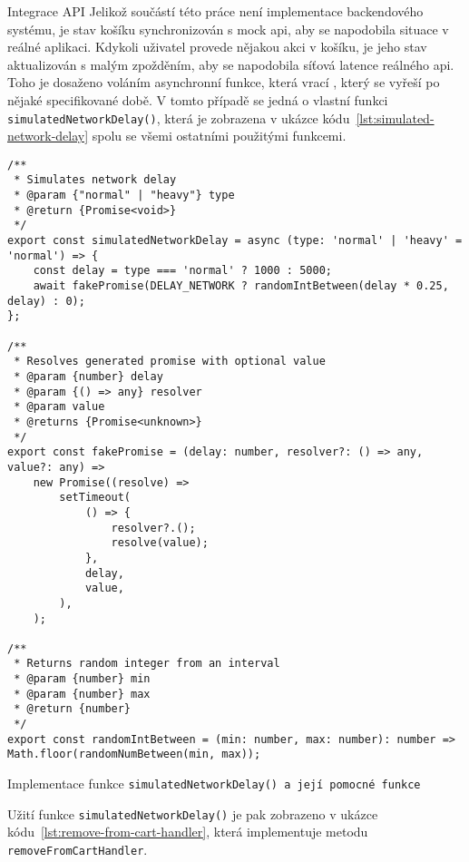 \begin{subsection}{Integrace API}
    \label{subsec:implementace-kosik-api}
    Jelikož součástí této práce není implementace backendového systému, je stav košíku synchronizován s mock \ac{api}, aby se napodobila situace v reálné aplikaci.
    Kdykoli uživatel provede nějakou akci v košíku, je jeho stav aktualizován s malým zpožděním, aby se napodobila síťová latence reálného \ac{api}.
    Toho je dosaženo voláním asynchronní funkce, která vrací , který se vyřeší po nějaké specifikované době.
    V tomto případě se jedná o vlastní funkci \texttt{simulatedNetworkDelay()}, která je zobrazena v ukázce kódu~\ref{lst:simulated-network-delay} spolu se všemi ostatními použitými funkcemi.

    \begin{listing}[H]
        \begin{verbatim}
/**
 * Simulates network delay
 * @param {"normal" | "heavy"} type
 * @return {Promise<void>}
 */
export const simulatedNetworkDelay = async (type: 'normal' | 'heavy' = 'normal') => {
	const delay = type === 'normal' ? 1000 : 5000;
	await fakePromise(DELAY_NETWORK ? randomIntBetween(delay * 0.25, delay) : 0);
};

/**
 * Resolves generated promise with optional value
 * @param {number} delay
 * @param {() => any} resolver
 * @param value
 * @returns {Promise<unknown>}
 */
export const fakePromise = (delay: number, resolver?: () => any, value?: any) =>
	new Promise((resolve) =>
		setTimeout(
			() => {
				resolver?.();
				resolve(value);
			},
			delay,
			value,
		),
	);

/**
 * Returns random integer from an interval
 * @param {number} min
 * @param {number} max
 * @return {number}
 */
export const randomIntBetween = (min: number, max: number): number => Math.floor(randomNumBetween(min, max));
        \end{verbatim}
        \caption{Implementace funkce \texttt{simulatedNetworkDelay() a její pomocné funkce}}
        \label{lst:simulated-network-delay}
    \end{listing}

    Užití funkce \texttt{simulatedNetworkDelay()} je pak zobrazeno v ukázce kódu~\ref{lst:remove-from-cart-handler}, která implementuje metodu \texttt{removeFromCartHandler}.


\end{subsection}
